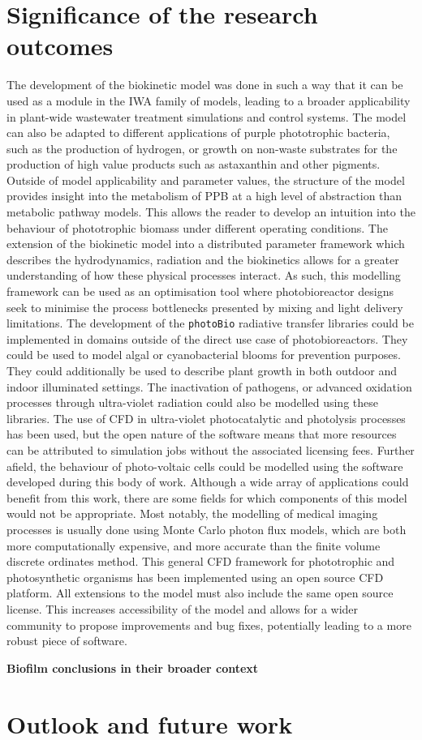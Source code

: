\section{Significance of the research outcomes}
The development of the biokinetic model was done in such a way that it can be used as a module in the IWA family of models, leading to a broader applicability in plant-wide wastewater treatment simulations and control systems. The model can also be adapted to different applications of purple phototrophic bacteria, such as the production of hydrogen, or growth on non-waste substrates for the production of high value products such as astaxanthin and other pigments. Outside of model applicability and parameter values, the structure of the model provides insight into the metabolism of PPB at a high level of abstraction than metabolic pathway models. This allows the reader to develop an intuition into the behaviour of phototrophic biomass under different operating conditions. 
\skippingparagraph
The extension of the biokinetic model into a distributed parameter framework which describes the hydrodynamics, radiation and the biokinetics allows for a greater understanding of how these physical processes interact. As such, this modelling framework can be used as an optimisation tool where photobioreactor designs seek to minimise the process bottlenecks presented by mixing and light delivery limitations. The development of the \texttt{photoBio} radiative transfer libraries could be implemented in domains outside of the direct use case of photobioreactors. They could be used to model algal or cyanobacterial blooms for prevention purposes. They could additionally be used to describe plant growth in both outdoor and indoor illuminated settings. The inactivation of pathogens, or advanced oxidation processes through ultra-violet radiation could also be modelled using these libraries. The use of CFD in ultra-violet photocatalytic and photolysis processes has been used, but the open nature of the software means that more resources can be attributed to simulation jobs without the associated licensing fees. Further afield, the behaviour of photo-voltaic cells could be modelled using the software developed during this body of work. Although a wide array of applications could benefit from this work, there are some fields for which components of this model would not be appropriate. Most notably, the modelling of medical imaging processes is usually done using Monte Carlo photon flux models, which are both more computationally expensive, and more accurate than the finite volume discrete ordinates method.
\skippingparagraph
This general CFD framework for phototrophic and photosynthetic organisms has been implemented using an open source CFD platform. All extensions to the model must also include the same open source license. This increases accessibility of the model and allows for a wider community to propose improvements and bug fixes, potentially leading to a more robust piece of software. 


\textbf{Biofilm conclusions in their broader context}



\section{Outlook and future work}
